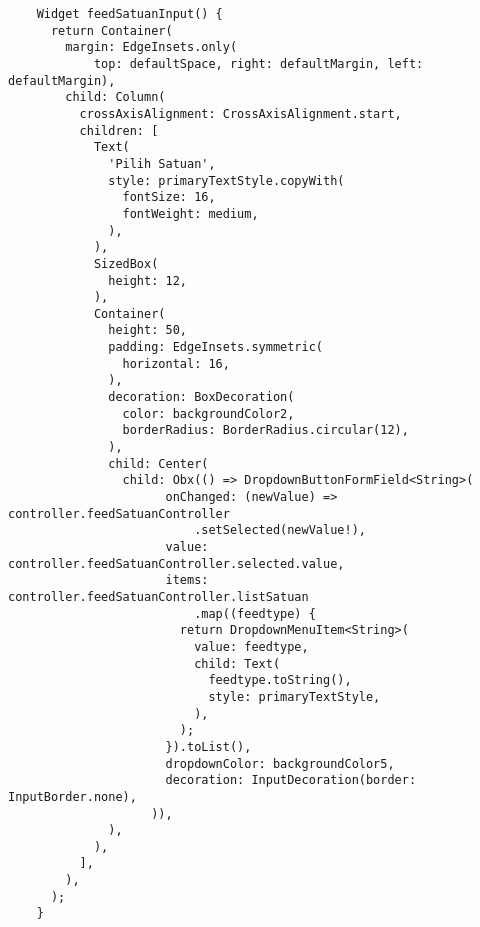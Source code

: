\begin{lstlisting}
    Widget feedSatuanInput() {
      return Container(
        margin: EdgeInsets.only(
            top: defaultSpace, right: defaultMargin, left: defaultMargin),
        child: Column(
          crossAxisAlignment: CrossAxisAlignment.start,
          children: [
            Text(
              'Pilih Satuan',
              style: primaryTextStyle.copyWith(
                fontSize: 16,
                fontWeight: medium,
              ),
            ),
            SizedBox(
              height: 12,
            ),
            Container(
              height: 50,
              padding: EdgeInsets.symmetric(
                horizontal: 16,
              ),
              decoration: BoxDecoration(
                color: backgroundColor2,
                borderRadius: BorderRadius.circular(12),
              ),
              child: Center(
                child: Obx(() => DropdownButtonFormField<String>(
                      onChanged: (newValue) => controller.feedSatuanController
                          .setSelected(newValue!),
                      value: controller.feedSatuanController.selected.value,
                      items: controller.feedSatuanController.listSatuan
                          .map((feedtype) {
                        return DropdownMenuItem<String>(
                          value: feedtype,
                          child: Text(
                            feedtype.toString(),
                            style: primaryTextStyle,
                          ),
                        );
                      }).toList(),
                      dropdownColor: backgroundColor5,
                      decoration: InputDecoration(border: InputBorder.none),
                    )),
              ),
            ),
          ],
        ),
      );
    }


\end{lstlisting}
